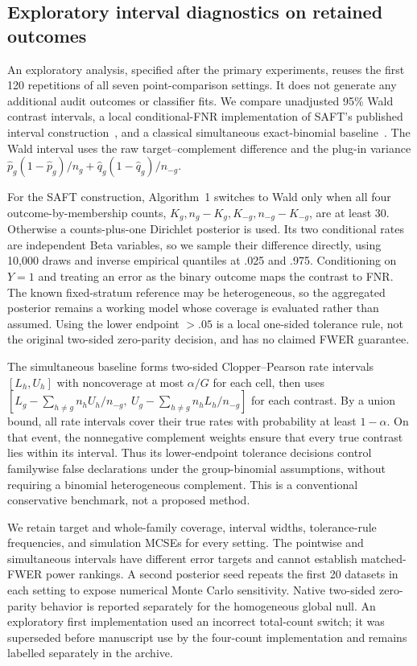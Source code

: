 \documentclass[Afour,sageh,times,doublespace]{sagej}
\begin{document}
\subsection{Exploratory interval diagnostics on retained outcomes}
An exploratory analysis, specified after the primary experiments, reuses the first 120 repetitions of all seven point-comparison settings. It does not generate any additional audit outcomes or classifier fits. We compare unadjusted 95\% Wald contrast intervals, a local conditional-FNR implementation of SAFT's published interval construction~\citep{ferrara2025saft}, and a classical simultaneous exact-binomial baseline~\citep{clopper1934confidence}. The Wald interval uses the raw target--complement difference and the plug-in variance $\widehat p_g(1-\widehat p_g)/n_g+\widehat q_g(1-\widehat q_g)/n_{-g}$.

For the SAFT construction, Algorithm~1 switches to Wald only when all four outcome-by-membership counts, $K_g,n_g-K_g,K_{-g},n_{-g}-K_{-g}$, are at least 30. Otherwise a counts-plus-one Dirichlet posterior is used. Its two conditional rates are independent Beta variables, so we sample their difference directly, using 10,000 draws and inverse empirical quantiles at .025 and .975. Conditioning on $Y=1$ and treating an error as the binary outcome maps the contrast to FNR. The known fixed-stratum reference may be heterogeneous, so the aggregated posterior remains a working model whose coverage is evaluated rather than assumed. Using the lower endpoint $>.05$ is a local one-sided tolerance rule, not the original two-sided zero-parity decision, and has no claimed FWER guarantee.

The simultaneous baseline forms two-sided Clopper--Pearson rate intervals $[L_h,U_h]$ with noncoverage at most $\alpha/G$ for each cell, then uses $[L_g-\sum_{h\ne g}n_hU_h/n_{-g},\ U_g-\sum_{h\ne g}n_hL_h/n_{-g}]$ for each contrast. By a union bound, all rate intervals cover their true rates with probability at least $1-\alpha$. On that event, the nonnegative complement weights ensure that every true contrast lies within its interval. Thus its lower-endpoint tolerance decisions control familywise false declarations under the group-binomial assumptions, without requiring a binomial heterogeneous complement. This is a conventional conservative benchmark, not a proposed method.

We retain target and whole-family coverage, interval widths, tolerance-rule frequencies, and simulation MCSEs for every setting. The pointwise and simultaneous intervals have different error targets and cannot establish matched-FWER power rankings. A second posterior seed repeats the first 20 datasets in each setting to expose numerical Monte Carlo sensitivity. Native two-sided zero-parity behavior is reported separately for the homogeneous global null. An exploratory first implementation used an incorrect total-count switch; it was superseded before manuscript use by the four-count implementation and remains labelled separately in the archive.
\end{document}
